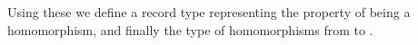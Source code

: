 \begin{code}
\AgdaSymbol{)}\<%
\\
%
\\[\AgdaEmptyExtraSkip]%
%
\>[1]\AgdaSpace{}%
\AgdaSymbol{:}\AgdaSpace{}%
\AgdaSymbol{(}\AgdaOperator{\AgdaFunction{𝔻[}}\AgdaSpace{}%
\AgdaSpace{}%
\AgdaOperator{\AgdaFunction{]}}\AgdaSpace{}%
\AgdaSpace{}%
\AgdaOperator{\AgdaFunction{𝔻[}}\AgdaSpace{}%
\AgdaSpace{}%
\AgdaOperator{\AgdaFunction{]}}\AgdaSymbol{)}\AgdaSpace{}%
\AgdaSpace{}%
\AgdaSpace{}%
\AgdaSymbol{\AgdaUnderscore{}}\<%
\\
%
\>[1]\AgdaSpace{}%
\AgdaSpace{}%
\AgdaSymbol{=}\AgdaSpace{}%
\AgdaSpace{}%
\AgdaSymbol{\{}\AgdaSymbol{\}}\AgdaSpace{}%
\AgdaSpace{}%
\AgdaSpace{}%
\AgdaSpace{}%
\<%
\\
\>[0]\<%
\end{code}
Using these we define a record type  representing the property of being
a homomorphism, and finally the type  of homomorphisms from  to .

